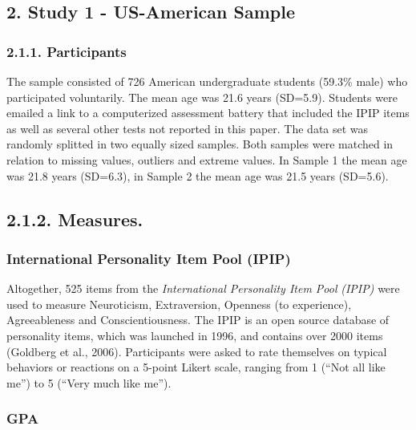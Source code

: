 \documentclass[man]{apa6}
\theoremstyle{definition}
\theoremstyle{definition}
\theoremstyle{definition}
\theoremstyle{remark}
\begin{document}
\hypertarget{study-1---us-american-sample}{%
\subsection{2. Study 1 - US-American
Sample}\label{study-1---us-american-sample}}

\hypertarget{participants}{%
\subsubsection{2.1.1. Participants}\label{participants}}

The sample consisted of 726 American undergraduate students (59.3\%
male) who participated voluntarily. The mean age was 21.6 years
(SD=5.9). Students were emailed a link to a computerized assessment
battery that included the IPIP items as well as several other tests not
reported in this paper. The data set was randomly splitted in two
equally sized samples. Both samples were matched in relation to missing
values, outliers and extreme values. In Sample 1 the mean age was 21.8
years (SD=6.3), in Sample 2 the mean age was 21.5 years (SD=5.6).

\hypertarget{measures.}{%
\subsection{2.1.2. Measures.}\label{measures.}}

\hypertarget{international-personality-item-pool-ipip}{%
\subsubsection{International Personality Item Pool
(IPIP)}\label{international-personality-item-pool-ipip}}

Altogether, 525 items from the \emph{International Personality Item
Pool} \emph{(IPIP)} were used to measure Neuroticism, Extraversion,
Openness (to experience), Agreeableness and Conscientiousness. The IPIP
is an open source database of personality items, which was launched in
1996, and contains over 2000 items (Goldberg et al., 2006). Participants
were asked to rate themselves on typical behaviors or reactions on a
5-point Likert scale, ranging from 1 (\enquote{Not all like me}) to 5
(\enquote{Very much like me}).

\hypertarget{gpa}{%
\subsubsection{GPA}\label{gpa}}
\end{document}
